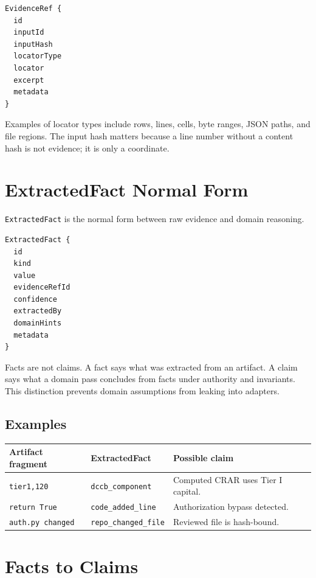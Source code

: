 \documentclass[11pt]{article}
\begin{document}
\begin{verbatim}
EvidenceRef {
  id
  inputId
  inputHash
  locatorType
  locator
  excerpt
  metadata
}
\end{verbatim}

Examples of locator types include rows, lines, cells, byte ranges, JSON paths, and file regions. The input hash matters because a line number without a content hash is not evidence; it is only a coordinate.

\section{ExtractedFact Normal Form}

\texttt{ExtractedFact} is the normal form between raw evidence and domain reasoning.

\begin{verbatim}
ExtractedFact {
  id
  kind
  value
  evidenceRefId
  confidence
  extractedBy
  domainHints
  metadata
}
\end{verbatim}

Facts are not claims. A fact says what was extracted from an artifact. A claim says what a domain pass concludes from facts under authority and invariants. This distinction prevents domain assumptions from leaking into adapters.

\subsection{Examples}

\begin{center}
\begin{tabular}{lll}
\toprule
\textbf{Artifact fragment} & \textbf{ExtractedFact} & \textbf{Possible claim} \\
\midrule
\texttt{tier1,120} & \texttt{dccb\_component} & Computed CRAR uses Tier I capital. \\
\texttt{return True} & \texttt{code\_added\_line} & Authorization bypass detected. \\
\texttt{auth.py changed} & \texttt{repo\_changed\_file} & Reviewed file is hash-bound. \\
\bottomrule
\end{tabular}
\end{center}

\section{Facts to Claims}
\end{document}
